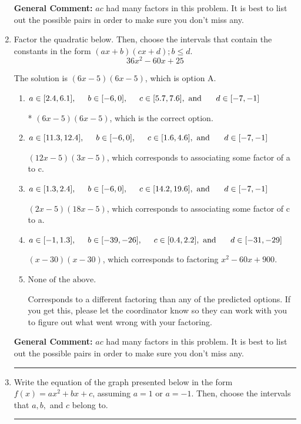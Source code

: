 \documentclass{extbook}[14pt]
\newcommand{\litem}[1]{\item #1

\rule{\textwidth}{0.4pt}}
\begin{document}
\begin{enumerate}
{\textbf{General Comment:} $ac$ had many factors in this problem. It is best to list out the possible pairs in order to make sure you don't miss any.
}
\litem{
Factor the quadratic below. Then, choose the intervals that contain the constants in the form $(ax+b)(cx+d); b \leq d.$
\[ 36x^{2} -60 x + 25 \]

The solution is \( (6x -5)(6x -5) \), which is option A.\begin{enumerate}[label=\Alph*.]
\item \( a \in [2.4, 6.1], \hspace*{5mm} b \in [-6, 0], \hspace*{5mm} c \in [5.7, 7.6], \text{ and } \hspace*{5mm} d \in [-7, -1] \)

* $(6x -5)(6x -5)$, which is the correct option.
\item \( a \in [11.3, 12.4], \hspace*{5mm} b \in [-6, 0], \hspace*{5mm} c \in [1.6, 4.6], \text{ and } \hspace*{5mm} d \in [-7, -1] \)

 $(12x -5)(3x -5)$, which corresponds to associating some factor of a to c.
\item \( a \in [1.3, 2.4], \hspace*{5mm} b \in [-6, 0], \hspace*{5mm} c \in [14.2, 19.6], \text{ and } \hspace*{5mm} d \in [-7, -1] \)

 $(2x -5)(18x -5)$, which corresponds to associating some factor of c to a.
\item \( a \in [-1, 1.3], \hspace*{5mm} b \in [-39, -26], \hspace*{5mm} c \in [0.4, 2.2], \text{ and } \hspace*{5mm} d \in [-31, -29] \)

 $(x -30)(x -30)$, which corresponds to factoring $x^{2} -60 x + 900$.
\item \( \text{None of the above.} \)

 Corresponds to a different factoring than any of the predicted options. If you get this, please let the coordinator know so they can work with you to figure out what went wrong with your factoring.
\end{enumerate}

\textbf{General Comment:} $ac$ had many factors in this problem. It is best to list out the possible pairs in order to make sure you don't miss any.
}
\litem{
Write the equation of the graph presented below in the form $f(x)=ax^2+bx+c$, assuming  $a=1$ or $a=-1$. Then, choose the intervals that $a, b,$ and $c$ belong to.

}
\end{enumerate}
\end{document}

